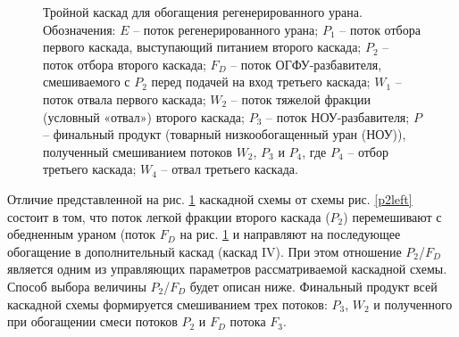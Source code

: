 \begin{figure}[ht]
    \caption{Тройной каскад для обогащения регенерированного урана. Обозначения: $E$ -- поток регенерированного урана; $P_1$ -- поток отбора первого каскада, выступающий питанием второго каскада; $P_2$ -- поток отбора второго каскада; $F_{D}$ -- поток ОГФУ-разбавителя, смешиваемого с $P_2$ перед подачей на вход третьего каскада; $W_1$ -- поток отвала первого каскада; $W_2$ -- поток тяжелой фракции (условный «отвал») второго каскада; $P_3$ -- поток НОУ-разбавителя; $P$ -- финальный продукт (товарный низкообогащенный уран (НОУ)), полученный смешиванием потоков $W_2$, $P_3$ и $P_4$, где $P_4$ -- отбор третьего каскада; $W_4$ -- отвал третьего каскада.}\label{p2_withDepU}
\end{figure}

Отличие представленной на рис. \ref{p2_withDepU} каскадной схемы от схемы рис. \ref{p2left} состоит в том, что поток легкой фракции второго каскада ($P_2$) перемешивают с обедненным ураном (поток $F_{D}$ на рис. \ref{p2_withDepU} и направляют на последующее обогащение в дополнительный каскад (каскад IV). При этом отношение $P_2$/$F_{D}$ является одним из управляющих параметров рассматриваемой каскадной схемы. Способ выбора величины $P_2$/$F_{D}$ будет описан ниже. Финальный продукт всей каскадной схемы формируется смешиванием трех потоков: $P_3$, $W_2$ и полученного при обогащении смеси потоков $P_2$ и $F_{D}$ потока $F_3$.

